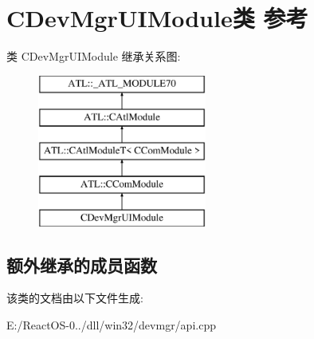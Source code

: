 \hypertarget{class_c_dev_mgr_u_i_module}{}\section{C\+Dev\+Mgr\+U\+I\+Module类 参考}
\label{class_c_dev_mgr_u_i_module}
类 C\+Dev\+Mgr\+U\+I\+Module 继承关系图\+:\begin{figure}[H]
\begin{center}
\leavevmode
\includegraphics[height=5.000000cm]{class_c_dev_mgr_u_i_module}
\end{center}
\end{figure}
\subsection*{额外继承的成员函数}


该类的文档由以下文件生成\+:\begin{DoxyCompactItemize}
\item 
E\+:/\+React\+O\+S-\/0../dll/win32/devmgr/api.\+cpp\end{DoxyCompactItemize}
